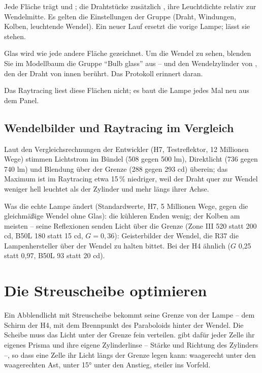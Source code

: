Jede Fläche trägt  und ; die Drahtstücke zusätzlich
, ihre Leuchtdichte relativ zur Wendelmitte. Es gelten die Einstellungen der
Gruppe  (Draht, Windungen, Kolben, leuchtende Wendel). Ein neuer Lauf ersetzt die
vorige Lampe;  lässt sie stehen.

\begin{tipp}
Glas wird wie jede andere Fläche gezeichnet. Um die Wendel zu sehen, blenden Sie im Modellbaum die
Gruppe \enquote{Bulb glass} aus -- und den Wendelzylinder von , den der Draht
von innen berührt. Das Protokoll erinnert daran.
\end{tipp}

Das Raytracing liest diese Flächen nicht; es baut die Lampe jedes Mal neu aus dem Panel.

\subsection{Wendelbilder und Raytracing im Vergleich}

Laut den Vergleichsrechnungen der Entwickler (H7, Testreflektor, 12 Millionen Wege) stimmen
Lichtstrom im Bündel (508 gegen 500 lm), Direktlicht (736 gegen 740 lm) und Blendung über der Grenze
(288 gegen 293 cd) überein; das Maximum ist im Raytracing etwa 15\,\% niedriger, weil der Draht quer
zur Wendel weniger hell leuchtet als der Zylinder und mehr längs ihrer Achse.

Was die echte Lampe ändert (Standardwerte, H7, 5 Millionen Wege, gegen die gleichmäßige Wendel ohne
Glas): die kühleren Enden wenig; der Kolben am meisten -- seine Reflexionen senden Licht über die
Grenze (Zone III 520 statt 200 cd, B50L 180 statt 15 cd, $G = 0{,}36$): Geisterbilder der Wendel, die
R37 die Lampenhersteller über der Wendel zu halten bittet. Bei der H4 ähnlich ($G$ 0,25 statt 0,97,
B50L 93 statt 20 cd).

\section{Die Streuscheibe optimieren}\label{sec:al-optimieren}

Ein Abblendlicht mit Streuscheibe bekommt seine Grenze von der Lampe -- dem Schirm der H4, mit dem
Brennpunkt des Paraboloids hinter der Wendel. Die Scheibe muss das Licht unter der Grenze fein
verteilen.  gibt dafür jeder Zelle ihr eigenes Prisma und ihre eigene
Zylinderlinse -- Stärke und Richtung des Zylinders --, so dass eine Zelle ihr Licht längs der
Grenze legen kann: waagerecht unter den waagerechten Ast, unter \ang{15} unter den Anstieg, steiler
ins Vorfeld.

